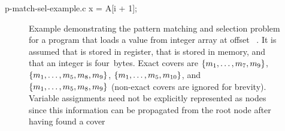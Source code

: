\begin{filecontents*}{p-match-sel-example.c}
x = A[i + 1];
\end{filecontents*}

\begin{figure}
  \centering%
                {%
                  \begin{lstpage}{2.6cm}%
                  \end{lstpage}%
                }%
  \hfill%
  \hfill%

  \caption[Example of the pattern matching and selection problem]%
          {%
            Example demonstrating the pattern matching and selection problem for
            a program that loads a value from integer array  at offset
            \mbox{ \irCode*{\irAddText{}} }.
            It is assumed that  is stored in register, that 
            is stored in memory, and that an integer is four~bytes.
            Exact covers are \mbox{$\mSet{m_1, \ldots, m_7, m_9}$},
            \mbox{$\mSet{m_1, \ldots, m_5, m_8, m_9}$}, \mbox{$\mSet{m_1,
                \ldots, m_5, m_{10}}$}, and \mbox{$\mSet{m_1, \ldots, m_5, m_8,
                m_9}$} (non-exact covers are ignored for brevity).
            Variable assignments need not be explicitly represented as nodes
            since this information can be propagated from the root node after
            having found a cover%
          }
\end{figure}

